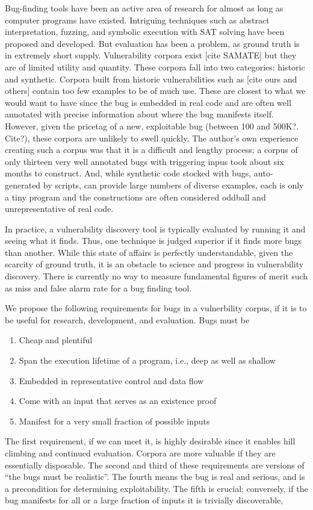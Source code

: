 Bug-finding tools have been an active area of research for almost as long as computer programs have existed. 
Intriguing techniques such as abstract interpretation, fuzzing, and symbolic execution with SAT solving have been proposed and developed.
But evaluation has been a problem, as  ground truth is in extremely short supply.
Vulnerability corpora exist [cite SAMATE] but they are of limited utility and quantity.
These corpora fall into two categories: historic and synthetic.
Corpora built from historic vulnerabilities such as [cite ours and others] contain too few examples to be of much use.
These are closest to what we would want to have since the bug is embedded in real code and are often well annotated with precise information about where the bug manifests itself.
However, given the pricetag of a new, exploitable bug (between 100 and 500K?. Cite?), these corpora are unlikely to swell quickly.
The author's own experience creating such a corpus was that it is a difficult and lengthy process; a corpus of only thirteen very well annotated bugs with triggering inpus took about six months to construct. 
And, while synthetic code stocked with bugs, auto-generated by scripts, can provide large numbers of diverse examples, each is only a tiny program and the constructions are often considered oddball and unrepresentative of real code.

In practice, a vulnerability discovery tool is typically evaluated by running it and seeing what it finds. 
Thus, one technique is judged superior if it finds more bugs than another.
While this state of affairs is perfectly understandable, given the scarcity of ground truth, it is an obstacle to science and progress in vulnerability discovery.
There is currently no way to measure fundamental figures of merit such as miss and false alarm rate for a bug finding tool.

We propose the following requirements for bugs in a vulnerbility corpus, if it is to be useful for research, development, and evaluation.
Bugs must be
\begin{enumerate}
\item Cheap and plentiful
\item Span the execution lifetime of a program, i.e., deep as well as shallow
\item Embedded in representative control and data flow
\item Come with an input that serves as an existence proof 
\item Manifest for a very small fraction of possible inputs
\end {enumerate}
The first requirement, if we can meet it, is highly desirable since it enables hill climbing and continued evaluation.
Corpora are more valuable if they are essentially disposable. 
The second and third of these requirements are versions of ``the bugs must be realistic''.
The fourth means the bug is real and serious, and is a precondition for determining exploitability. 
The fifth is crucial; conversely, if the bug manifests for all or a large fraction of inputs it is trivially discoverable,

